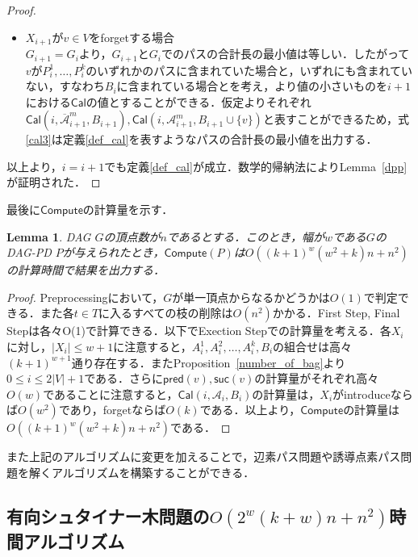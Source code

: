 \documentclass[master]{kuisthesis}		%
\theoremstyle{plain}
\newtheorem{lemma}{Lemma}
\theoremstyle{definition}
\begin{document}
\begin{proof}
\begin{itemize}
        \item $X_{i+1}$が$v \in V$をforgetする場合 \\
        $G_{i+1} = G_i$より，$G_{i+1}$と$G_i$でのパスの合計長の最小値は等しい．したがって$v$が$P^1_i, \dots , P^k_i$のいずれかのパスに含まれていた場合と，いずれにも含まれていない，すなわち$B_i$に含まれている場合とを考え，より値の小さいものを$i+1$における$\mathsf{Cal}$の値とすることができる．仮定よりそれぞれ$\mathsf{Cal}(i, \mathscr{\overline{A}}^m_{i+1}, B_{i+1}),\mathsf{Cal}(i, \mathscr{A}^m_{i+1}, B_{i+1} \cup \{v\})$と表すことができるため，式\ref{cal3}は定義\ref{def_cal}を表すようなパスの合計長の最小値を出力する．
    \end{itemize}
    以上より，$i = i+1$でも定義\ref{def_cal}が成立．数学的帰納法によりLemma~\ref{dpp}が証明された．
\end{proof}

最後に$\mathsf{Compute}$の計算量を示す．

\begin{lemma}
    DAG $G$の頂点数が$n$であるとする．このとき，幅が$w$である$G$のDAG-PD $P$が与えられたとき，$\mathsf{Compute}(P)$は$O((k+1)^w(w^2+k)n+n^2)$の計算時間で結果を出力する．
\end{lemma}

\begin{proof}
    Preprocessingにおいて，$G$が単一頂点からなるかどうかは$O(1)$で判定できる．また各$t \in T$に入るすべての枝の削除は$O(n^2)$かかる．First Step, Final Stepは各々O(1)で計算できる．以下でExection Stepでの計算量を考える．各$X_i$に対し，$|X_i| \leq w+1$に注意すると，$A^1_i, A^2_i, \dots, A^k_i, B_i$の組合せは高々$(k+1)^{w+1}$通り存在する．またProposition~\ref{number_of_bag}より$0 \leq i \leq 2|V|+1$である．さらに$\mathsf{pred}(v), \mathsf{suc}(v)$の計算量がそれぞれ高々$O(w)$であることに注意すると，$\mathsf{Cal}(i, \mathscr{A}_i, B_i)$の計算量は，$X_i$がintroduceならば$O(w^2)$であり，forgetならば$O(k)$である．以上より，$\mathsf{Compute}$の計算量は$O((k+1)^w(w^2+k)n+n^2)$である．
\end{proof}

また上記のアルゴリズムに変更を加えることで，辺素パス問題や誘導点素パス問題を解くアルゴリズムを構築することができる．













\subsection{有向シュタイナー木問題の$O(2^w(k+w)n + n^2)$時間アルゴリズム}
\end{document}
